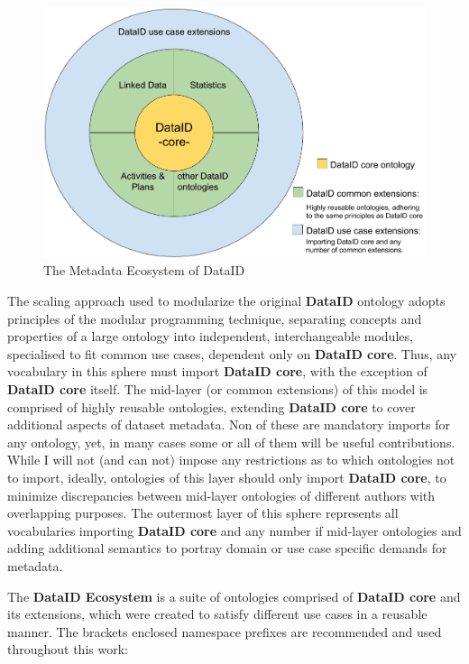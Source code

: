 \documentclass[a4paper,english,twoside,BCOR1.5cm,headsepline,DIV12,appendixprefix,final,12pt]{scrbook}
\newcommand{\ecosystem}{{\ttfamily\bfseries DataID Ecosystem}\xspace}
\newcommand{\dataid}{{\ttfamily\bfseries DataID}\xspace}
\newcommand{\core}{{\ttfamily\bfseries DataID core}\xspace}
\begin{document}
\begin{figure}[!htbp]
\centering
  \includegraphics[width=\textwidth]{images/DataIDonion.png}
  \caption{The Metadata Ecosystem of DataID}
  \label{fig:onion}
\end{figure}

The scaling approach used to modularize the original \dataid ontology adopts principles of the modular programming technique, separating concepts and properties of a large ontology into independent, interchangeable modules, specialised to fit common use cases, dependent only on \core. Thus, any vocabulary in this sphere must import \core, with the exception of \core itself. 
The mid-layer (or common extensions) of this model is comprised of highly reusable ontologies, extending \core to cover additional aspects of dataset metadata. Non of these are mandatory imports for any ontology, yet, in many cases some or all of them will be useful contributions. While I will not (and can not) impose any restrictions as to which ontologies not to import, ideally, ontologies of this layer should only import \core, to minimize discrepancies between mid-layer ontologies of different authors with overlapping purposes. The outermost layer of this sphere represents all vocabularies importing \core and any number if mid-layer ontologies and adding additional semantics to portray domain or use case specific demands for metadata.

The \ecosystem is a suite of ontologies comprised of \core and its extensions, which were created to satisfy different use cases in a reusable manner. The brackets enclosed namespace prefixes are recommended and used throughout this work:
\end{document}
